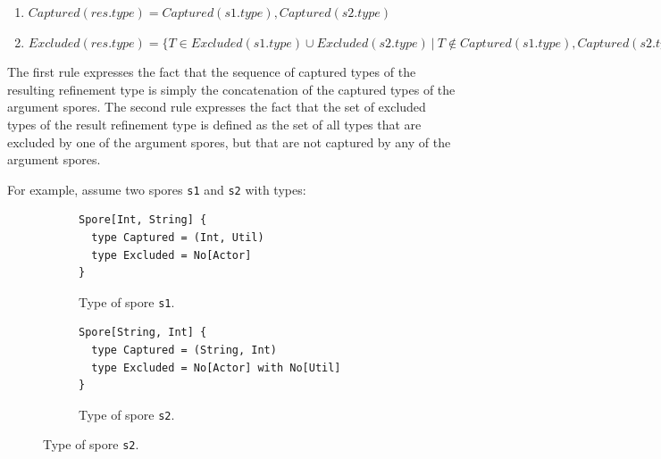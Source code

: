 \documentclass[runningheads]{llncs}
\begin{document}
\begin{sloppypar}
\begin{enumerate}

\item $Captured(res.type) = Captured(s1.type), Captured(s2.type)$

\item $Excluded(res.type) = \{ T \in Excluded(s1.type) \cup Excluded(s2.type) ~|~ T \notin Captured(s1.type), Captured(s2.type) \}$

\end{enumerate}

The first rule expresses the fact that the sequence of captured types of the resulting refinement type is simply the concatenation of the captured types of the argument spores. The second rule expresses the fact that the set of excluded types of the result refinement type is defined as the set of all types that are excluded by one of the argument spores, but that are not captured by any of the argument spores.

For example, assume two spores \verb|s1| and \verb|s2| with types:

\begin{figure}[h!]
\vspace{0.5mm}
\begin{subfigure}{.5\textwidth}
  \centering
  \begin{lstlisting}
Spore[Int, String] {
  type Captured = (Int, Util)
  type Excluded = No[Actor]
}
  \end{lstlisting}
  \vspace{-4mm}
  \caption{Type of spore \texttt{s1}.}
\end{subfigure}%
\begin{subfigure}{.5\textwidth}
  \centering
  \begin{lstlisting}
Spore[String, Int] {
  type Captured = (String, Int)
  type Excluded = No[Actor] with No[Util]
}
  \end{lstlisting}
  \vspace{-4mm}
  \caption{Type of spore \texttt{s2}.}
\end{subfigure}%
\label{fig:spore-composition}
\vspace{0.5mm}
\end{figure}



\end{sloppypar}
\end{document}
